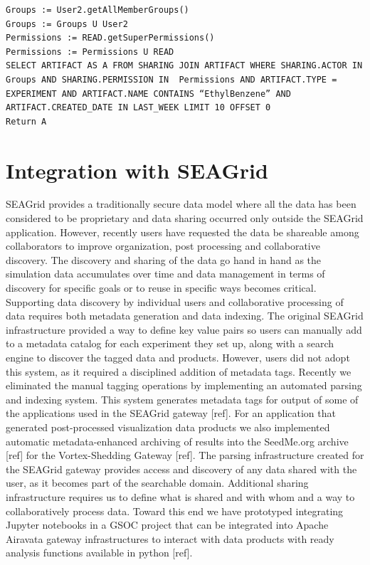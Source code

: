 \documentclass[sigconf]{acmart}
\begin{document}
\begin{lstlisting}
Groups := User2.getAllMemberGroups()
Groups := Groups U User2
Permissions := READ.getSuperPermissions()
Permissions := Permissions U READ
SELECT ARTIFACT AS A FROM SHARING JOIN ARTIFACT WHERE SHARING.ACTOR IN Groups AND SHARING.PERMISSION IN  Permissions AND ARTIFACT.TYPE = EXPERIMENT AND ARTIFACT.NAME CONTAINS “EthylBenzene” AND ARTIFACT.CREATED_DATE IN LAST_WEEK LIMIT 10 OFFSET 0
Return A
\end{lstlisting}

\section{Integration with SEAGrid}

SEAGrid provides a traditionally secure data model where all the data has been considered to be proprietary and data sharing occurred only outside the SEAGrid application. However, recently users have requested the data be shareable among collaborators to improve organization, post processing and collaborative discovery. The discovery and sharing of the data go hand in hand as the simulation data accumulates over time and data management in terms of discovery for specific goals or to reuse in specific ways becomes critical. Supporting data discovery by individual users and collaborative processing of data requires both metadata generation and data indexing. The original SEAGrid infrastructure provided a way to define key value pairs so users can manually add to a metadata catalog for each experiment they set up, along with a search engine to discover the tagged data and products. However, users did not adopt this system, as it required a disciplined addition of metadata tags.  
Recently we eliminated the manual tagging operations by implementing an automated parsing and indexing system. This system generates metadata tags for output of some of the applications used in the SEAGrid gateway [ref]. For an application that generated post-processed visualization data products we also implemented automatic metadata-enhanced archiving of results into the SeedMe.org archive [ref] for the Vortex-Shedding Gateway [ref]. The parsing infrastructure created for the SEAGrid gateway provides access and discovery of any data shared with the user, as it becomes part of the searchable domain. Additional sharing infrastructure requires us to define what is shared and with whom and a way to collaboratively process data. Toward this end we have prototyped integrating Jupyter notebooks in a GSOC project that can be integrated into Apache Airavata gateway infrastructures to interact with data products with ready analysis functions available in python [ref].   
\end{document}
